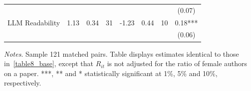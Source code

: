 \begin{table}[H]
\begin{threeparttable}
\begin{tabular}{p{3cm}S[table-format=3.3]@{}S[table-format=3.3]@{}S[table-format=3.2]@{}S[table-format=4.3]@{}S[table-format=3.3]@{}S[table-format=3.1]@{}S@{}}
                                          &            &            &            &            &            &            &      (0.07)   \\
            LLM Readability               &        1.13&        0.34&          31&       -1.23&        0.44&          10&        0.18***\\
                                          &            &            &            &            &            &            &      (0.06)   \\
            \bottomrule
        \end{tabular}
        \begin{tablenotes}
            \tiny
            \item \textit{Notes}. Sample 121 matched pairs. Table displays estimates identical to those in~\autoref{table8_base}, except that \(R_{it}\) is not adjusted for the ratio of female authors on a paper. ***, ** and * statistically significant at 1\%, 5\% and 10\%, respectively.
        \end{tablenotes}
    \end{threeparttable}
\end{table}